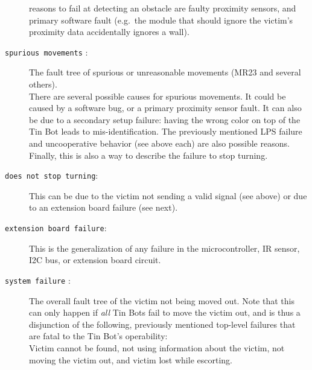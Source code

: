 \documentclass[a4paper,parskip,headheight=38pt]{scrartcl} %
\begin{document}
\begin{description}
    reasons to fail at detecting an obstacle are faulty proximity
    sensors, and primary software fault (e.g.\ the module that should
    ignore the victim's proximity data accidentally ignores a wall).
\item[\texttt{spurious movements} \refpdf{spuriousmovements}:]
    The fault tree of spurious or unreasonable movements (MR23 and
    several others).
     \\
    There are several possible causes for spurious movements.  It could
    be caused by a software bug, or a primary proximity sensor fault.
    It can also be due to a secondary setup failure: having the wrong
    color on top of the Tin Bot leads to mis-identification.  The
    previously mentioned LPS failure and uncooperative behavior (see
    above each) are also possible reasons. Finally, this is also a way
    to describe the failure to stop turning.
\item[\texttt{does not stop turning}:]
    This can be due to the victim not sending a valid signal (see
    above) or due to an extension board failure (see next).
\item[\texttt{extension board failure}:]
    This is the generalization of any failure in the microcontroller,
    IR sensor, I2C bus, or extension board circuit.
\item[\texttt{system failure} \refpdf{systemfailure}:]
    The overall fault tree of the victim not being moved out.  Note
    that this can only happen if \emph{all} Tin Bots fail to move the
    victim out, and is thus a disjunction of the following, previously
    mentioned top-level failures that are fatal to the Tin Bot's
    operability:
     \\
    Victim cannot be found, not using information
    about the victim, not moving the victim out, and
    victim lost while escorting.
\end{description}
\end{document}
